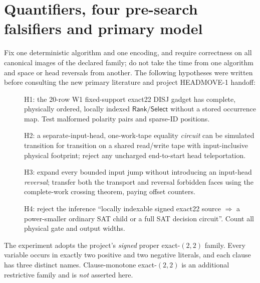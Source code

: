 \documentclass[11pt]{article}
\newcommand{\Rank}{\mathsf{Rank}}
\newcommand{\Select}{\mathsf{Select}}
\begin{document}
\section{Quantifiers, four pre-search falsifiers and primary model}
Fix one deterministic algorithm and one encoding, and require correctness on
all canonical images of the declared family; do not take the time from one
algorithm and space or head reversals from another.  The following
hypotheses were written before consulting the new primary literature and
project HEADMOVE-1 handoff:
\begin{description}
\item[] H1: the 20-row W1 fixed-support exact22 DISJ gadget has complete,
physically ordered, locally indexed $\Rank/\Select$ without a stored
occurrence map. Test malformed polarity pairs and sparse-ID positions.
\item[] H2: a separate-input-head, one-work-tape equality \emph{circuit}
can be simulated transition for transition on a shared read/write tape
with input-inclusive physical footprint; reject any uncharged end-to-start
head teleportation.
\item[] H3: expand every bounded input jump without introducing an input-head
\emph{reversal}; transfer both the transport and reversal forbidden faces
using the complete-work crossing theorem, paying offset counters.
\item[] H4: reject the inference ``locally indexable signed exact22 source
$\Rightarrow$ a power-smaller ordinary SAT child or a full SAT decision
circuit''.  Count all physical gate and output widths.
\end{description}
The experiment adopts the project's \emph{signed} proper exact-$(2,2)$
family. Every variable occurs in exactly two positive and two negative
literals, and each clause has three distinct names. Clause-monotone
exact-$(2,2)$ is an additional restrictive family and is \emph{not}
asserted here.
\end{document}
